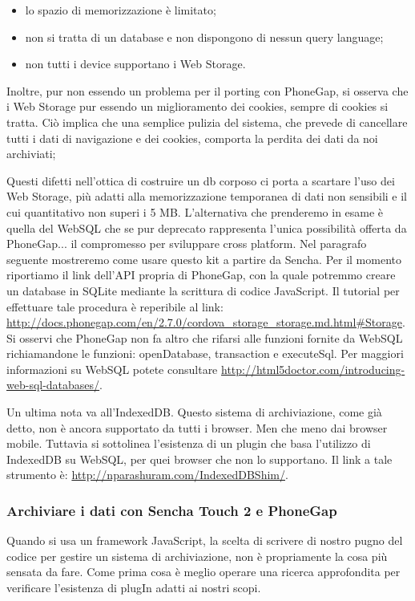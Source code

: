 \documentclass[10pt,a4paper,onecolumn]{article}
\begin{document}
\begin{itemize}
	\item lo spazio di memorizzazione è limitato;
	\item non si tratta di un database e non dispongono di nessun query language;
	\item non tutti i device supportano i Web Storage.
\end{itemize}
Inoltre, pur non essendo un problema per il porting con PhoneGap, si osserva che i Web Storage pur essendo un miglioramento dei cookies, sempre di cookies si tratta. Ciò implica che una semplice pulizia del sistema, che prevede di cancellare tutti i dati di navigazione e dei cookies, comporta la perdita dei dati da noi archiviati;

Questi difetti nell'ottica di costruire un db corposo ci porta a scartare l'uso dei Web Storage, più adatti alla memorizzazione temporanea di dati non sensibili e il cui quantitativo non superi i 5 MB. L'alternativa che prenderemo in esame è quella del WebSQL che se pur deprecato rappresenta l'unica possibilità offerta da PhoneGap... il compromesso per sviluppare cross platform. Nel paragrafo seguente mostreremo come usare questo kit a partire da Sencha. Per il momento riportiamo il link dell'API propria di PhoneGap, con la quale potremmo creare un database in SQLite mediante la scrittura di codice JavaScript. Il tutorial per effettuare tale procedura è reperibile al link: \url{http://docs.phonegap.com/en/2.7.0/cordova_storage_storage.md.html#Storage}. Si osservi che PhoneGap non fa altro che rifarsi alle funzioni fornite da WebSQL richiamandone le funzioni: openDatabase, transaction e executeSql. Per maggiori informazioni su WebSQL potete consultare \url{http://html5doctor.com/introducing-web-sql-databases/}.

Un ultima nota va all'IndexedDB. Questo sistema di archiviazione, come già detto, non è ancora supportato da tutti i browser. Men che meno dai browser mobile. Tuttavia si sottolinea l'esistenza di un plugin che basa l'utilizzo di IndexedDB su WebSQL, per quei browser che non lo supportano. Il link a tale strumento è: \url{http://nparashuram.com/IndexedDBShim/}.

\subsubsection{Archiviare i dati con Sencha Touch 2 e PhoneGap}

Quando si usa un framework JavaScript, la scelta di scrivere di nostro pugno del codice per gestire un sistema di archiviazione, non è propriamente la cosa più sensata da fare. Come prima cosa è meglio operare una ricerca approfondita per verificare l'esistenza di plugIn adatti ai nostri scopi. 
\end{document}
